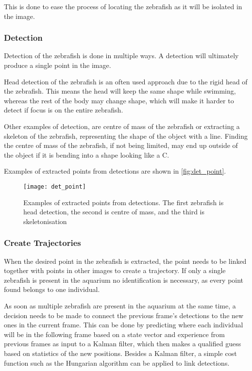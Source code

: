 This is done to ease the process of locating the zebrafish as it will be isolated in the image.

\subsubsection{Detection}
Detection of the zebrafish is done in multiple ways. A detection will ultimately produce a single point in the image.

Head detection of the zebrafish is an often used approach due to the rigid head of the zebrafish. This means the head will keep the same shape while swimming, whereas the rest of the body may change shape, which will make it harder to detect if focus is on the entire zebrafish.

Other examples of detection, are centre of mass of the zebrafish or extracting a skeleton of the zebrafish, representing the shape of the object with a line. Finding the centre of mass of the zebrafish, if not being limited, may end up outside of the object if it is bending into a shape looking like a C.

Examples of extracted points from detections are shown in \autoref{fig:det_point}.

\begin{figure}[H]
	\centering
	\texttt{[image: det\_point]}
	\caption{Examples of extracted points from detections. The first zebrafish is head detection, the second is centre of mass, and the third is skeletonisation}
	\label{fig:det_point}
\end{figure}

\subsubsection{Create Trajectories}
When the desired point in the zebrafish is extracted, the point needs to be linked together with points in other images to create a trajectory. If only a single zebrafish is present in the aquarium no identification is necessary, as every point found belongs to one individual.

As soon as multiple zebrafish are present in the aquarium at the same time, a decision needs to be made to connect the previous frame's detections to the new ones in the current frame. This can be done by predicting where each individual will be in the following frame based on a state vector and experience from previous frames as input to a Kalman filter, which then makes a qualified guess based on statistics of the new positions. Besides a Kalman filter, a simple cost function such as the Hungarian algorithm can be applied to link detections.\\

